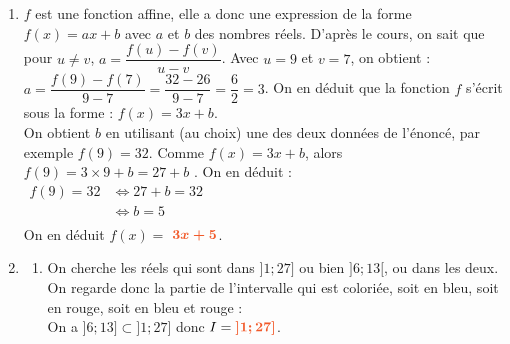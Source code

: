 \documentclass[a4paper,11pt]{article}
\newcounter{seancenum}
\newcounter{seancenumD}
\begin{document}
\setcounter{seancenumD}{12}
\newpage
\begin{seanceD}{} %
\begin{enumerate}
\item
 $f$ est une fonction affine, elle a donc une expression de la forme  $f(x)=ax+b$ avec $a$ et $b$ des nombres réels. D'après le cours, on sait que pour $u\neq v$, $a=\dfrac{f(u)-f(v)}{u-v}$. Avec $u=9$ et  $v=7$, on obtient  :  $a=\dfrac{f(9)-f(7)}{9-7}=\dfrac{32-26}{9-7}=\dfrac{6}{2}=3$. On en déduit que la fonction $f$ s'écrit sous la forme :    $f(x)=3 x +b.$\\On obtient $b$ en utilisant (au choix) une des deux données de l'énoncé, par exemple $f(9)=32$. Comme $f(x)=3x +b$, alors $f(9)=
              3\times9+b=27+b$ . On en déduit :\\$\begin{aligned}f(9)=32&\iff 27+b=32\\&\iff b=5\\\end{aligned}$\\On en déduit $f(x)=$ ${\color[HTML]{f15929}\boldsymbol{3x+5}}$.


\item \begin{enumerate}
\item On cherche les réels qui sont dans  $]1;27]$ ou bien  $]6;13[$, ou dans les deux. On regarde donc la partie de l'intervalle qui est coloriée, soit en bleu, soit en rouge, soit en bleu et rouge :\\On a $]6;13]\subset ]1;27]$ donc $I={\color[HTML]{f15929}\boldsymbol{]1;27]}}$.\\
\end{enumerate}
\end{enumerate}
\end{seanceD}
\end{document}
